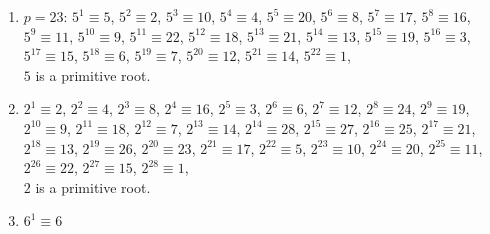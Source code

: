 {\begin{enumerate}
\begin{enumerate}[label=(\roman*)]
                  \item \(p = 23\): \(5^1 \equiv 5\),
                        \(5^{2} \equiv 2
                        \), \(5^{3} \equiv 10
                        \), \(5^{4} \equiv 4
                        \), \(5^{5} \equiv 20
                        \), \(5^{6} \equiv 8
                        \), \(5^{7} \equiv 17
                        \), \(5^{8} \equiv 16
                        \), \(5^{9} \equiv 11
                        \), \(5^{10} \equiv 9
                        \), \(5^{11} \equiv 22
                        \), \(5^{12} \equiv 18
                        \), \(5^{13} \equiv 21
                        \), \(5^{14} \equiv 13
                        \), \(5^{15} \equiv 19
                        \), \(5^{16} \equiv 3
                        \), \(5^{17} \equiv 15
                        \), \(5^{18} \equiv 6
                        \), \(5^{19} \equiv 7
                        \), \(5^{20} \equiv 12
                        \), \(5^{21} \equiv 14\),
                        \(5^{22} \equiv 1\), \\
                        \(5\) is a primitive root.
                  \item \(2^1 \equiv 2\),
                        \(2^{2} \equiv 4\),
                        \(2^{3} \equiv 8\),
                        \(2^{4} \equiv 16\),
                        \(2^{5} \equiv 3\),
                        \(2^{6} \equiv 6\),
                        \(2^{7} \equiv 12\),
                        \(2^{8} \equiv 24\),
                        \(2^{9} \equiv 19\),
                        \(2^{10} \equiv 9\),
                        \(2^{11} \equiv 18\),
                        \(2^{12} \equiv 7\),
                        \(2^{13} \equiv 14\),
                        \(2^{14} \equiv 28\),
                        \(2^{15} \equiv 27\),
                        \(2^{16} \equiv 25\),
                        \(2^{17} \equiv 21\),
                        \(2^{18} \equiv 13\),
                        \(2^{19} \equiv 26\),
                        \(2^{20} \equiv 23\),
                        \(2^{21} \equiv 17\),
                        \(2^{22} \equiv 5\),
                        \(2^{23} \equiv 10\),
                        \(2^{24} \equiv 20\),
                        \(2^{25} \equiv 11\),
                        \(2^{26} \equiv 22\),
                        \(2^{27} \equiv 15\),
                        \(2^{28} \equiv 1\), \\
                        \(2\) is a primitive root.
                  \item \(6^{1} \equiv 6\)

\end{enumerate}
\end{enumerate}}
